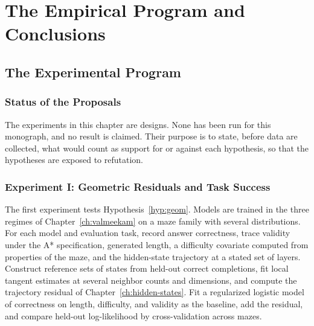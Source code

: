 \part{The Empirical Program and Conclusions}
\label{part:program}

\chapter{The Experimental Program}
\label{ch:experiments}

\section{Status of the Proposals}

The experiments in this chapter are designs. None has been run for this monograph, and no result is claimed. Their purpose is to state, before data are collected, what would count as support for or against each hypothesis, so that the hypotheses are exposed to refutation.

\section{Experiment I: Geometric Residuals and Task Success}

The first experiment tests Hypothesis~\ref{hyp:geom}. Models are trained in the three regimes of Chapter~\ref{ch:valmeekam} on a maze family with several distributions. For each model and evaluation task, record answer correctness, trace validity under the A* specification, generated length, a difficulty covariate computed from properties of the maze, and the hidden-state trajectory at a stated set of layers. Construct reference sets of states from held-out correct completions, fit local tangent estimates at several neighbor counts and dimensions, and compute the trajectory residual of Chapter~\ref{ch:hidden-states}. Fit a regularized logistic model of correctness on length, difficulty, and validity as the baseline, add the residual, and compare held-out log-likelihood by cross-validation across mazes.

